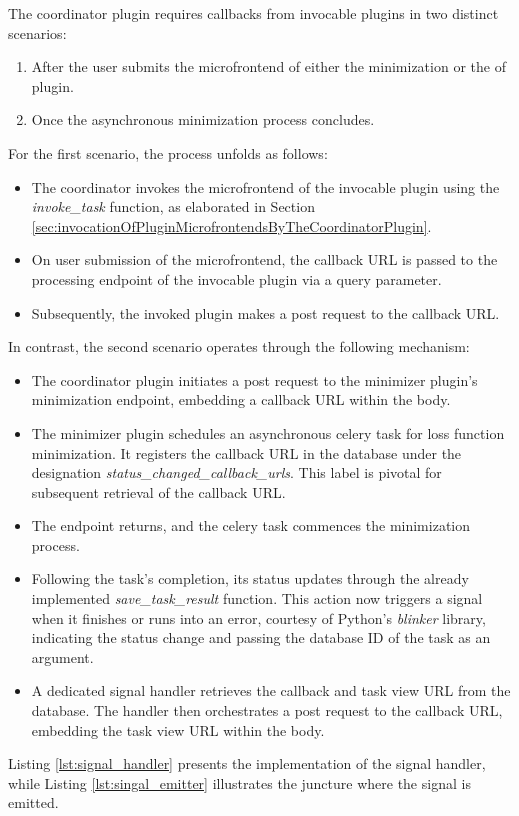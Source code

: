 \documentclass[
  a4paper,  %
  twoside,  %
  bibliography=totoc,
  headsepline,
  cleardoublepage=empty,
  parskip=half,
  draft=false
]{scrbook}
\begin{document}
The coordinator plugin requires callbacks from invocable plugins in two distinct scenarios:
\begin{enumerate}
    \item After the user submits the microfrontend of either the minimization or the \gls{of} plugin.
    \item Once the asynchronous minimization process concludes.
\end{enumerate}

For the first scenario, the process unfolds as follows:
\begin{itemize}
    \item The coordinator invokes the microfrontend of the invocable plugin using the \emph{invoke\_task} function, as elaborated in Section \ref{sec:invocationOfPluginMicrofrontendsByTheCoordinatorPlugin}.
    \item On user submission of the microfrontend, the callback URL is passed to the processing endpoint of the invocable plugin via a query parameter.
    \item Subsequently, the invoked plugin makes a post request to the callback URL.
\end{itemize}

In contrast, the second scenario operates through the following mechanism:
\begin{itemize}
    \item The coordinator plugin initiates a post request to the minimizer plugin's minimization endpoint, embedding a callback URL within the body.
    \item The minimizer plugin schedules an asynchronous celery task for loss function minimization.
    It registers the callback URL in the database under the designation \emph{status\_changed\_callback\_urls}.
    This label is pivotal for subsequent retrieval of the callback URL.
    \item The endpoint returns, and the celery task commences the minimization process.
    \item Following the task's completion, its status updates through the already implemented \emph{save\_task\_result} function.
    This action now triggers a signal when it finishes or runs into an error, courtesy of Python's \emph{blinker} library, indicating the status change and passing the database ID of the task as an argument.
    \item A dedicated signal handler retrieves the callback and task view URL from the database.
    The handler then orchestrates a post request to the callback URL, embedding the task view URL within the body.
\end{itemize}
Listing \ref{lst:signal_handler} presents the implementation of the signal handler, while Listing \ref{lst:singal_emitter} illustrates the juncture where the signal is emitted.
\end{document}
